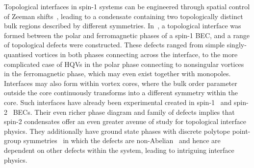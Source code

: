Topological interfaces in spin-1 systems can be engineered through spatial
control of Zeeman shifts~\cite{Borgh2012, Borgh2013, Borgh2014}, leading to
a condensate containing two topologically distinct bulk regions described by
different symmetries.
In~\cite{Borgh2012}, a topological interface was formed between the polar and
ferromagnetic phases of a spin-1 BEC, and a range of topological defects were
constructed.
These defects ranged from simple singly-quantised vortices in both phases
connecting across the interface, to the more complicated case of HQVs in the
polar phase connecting to nonsingular vortices in the ferromagnetic phase, which
may even exist together with monopoles.
Interfaces may also form within vortex cores, where the bulk order parameter
outside the core continuously transforms into a different symmetry within
the core.
Such interfaces have already been experimental created in
spin-1~\cite{Weiss2019,Xiao2021} and spin-2~\cite{Xiao2022} BECs.
Their even richer phase diagram and family of defects implies that spin-2
condensates offer an even greater avenue of study for topological interface
physics.
They additionally have ground state phases with discrete polytope point-group
symmetries~\cite{Xiao2022,Semenoff2007,Yip2007,Kawaguchi2011} in which the
defects are non-Abelian~\cite{Mermin1979} and hence are dependent on other
defects within the system, leading to intriguing interface physics.


